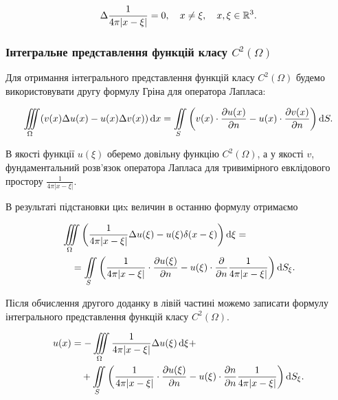 \begin{example}
	\begin{equation}
		\Delta \frac{1}{4 \pi |x - \xi|} = 0, \quad x \ne \xi, \quad x, \xi \in \mathbb{R}^3.
	\end{equation}
\end{example}

\subsubsection{Інтегральне представлення функцій класу $C^2(\Omega)$}

Для отримання інтегрального представлення функцій класу $C^2(\Omega)$ будемо використовувати другу формулу Гріна для оператора Лапласа:

\begin{equation}
	\displaystyle\iiint\limits_\Omega ( v(x) \Delta u(x) - u(x) \Delta v(x) ) \mathop{}\!\mathrm{d} x = \displaystyle\iint\limits_S \left( v(x) \cdot \frac{\partial u(x)}{\partial n} - u(x) \cdot \frac{\partial v(x)}{\partial n} \right) \mathop{}\!\mathrm{d} S.
\end{equation}

В якості функції $u(\xi)$ оберемо довільну функцію $C^2(\Omega)$, а у якості $v$, фундаментальний розв'язок оператора Лапласа для тривимірного евклідового простору $\frac{1}{4 \pi \vert x - \xi \vert}$.

В результаті підстановки циx величин в останню формулу отримаємо

\begin{equation}
	\begin{aligned}
		& \displaystyle\iiint\limits_\Omega \left( \frac{1}{4 \pi |x - \xi|} \Delta u(\xi) - u(\xi) \delta (x - \xi) \right) \mathop{}\!\mathrm{d} \xi = \\
		& \quad = \displaystyle\iint\limits_S \left( \frac{1}{4 \pi |x - \xi|} \cdot \frac{\partial u(\xi)}{\partial n} - u(\xi) \cdot \frac{\partial}{\partial n} \frac{1}{4 \pi |x - \xi|} \right) \mathop{}\!\mathrm{d} S_\xi.
	\end{aligned}
\end{equation}

Після обчислення другого доданку в лівій частині можемо записати формулу інтегрального представлення функцій класу $C^2(\Omega)$.

\begin{equation}
	\begin{aligned}
		u(x) &= - \displaystyle\iiint\limits_\Omega \frac{1}{4 \pi |x - \xi|} \Delta u(\xi) \mathop{}\!\mathrm{d} \xi + \\
		&\quad + \displaystyle\iint\limits_S \left( \frac{1}{4 \pi |x - \xi|} \cdot \frac{\partial u(\xi)}{\partial n} - u(\xi) \cdot \frac{\partial n}{\partial n} \frac{1}{4 \pi |x - \xi|} \right) \mathop{}\!\mathrm{d} S_\xi.
	\end{aligned}
\end{equation}

